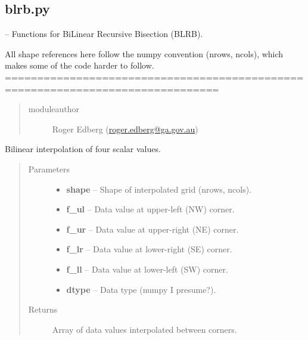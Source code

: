 \documentclass[letterpaper,10pt,english]{sphinxmanual}
\begin{document}
\subsection{blrb.py}
\label{docs/utilities:module-blrb}\label{docs/utilities:blrb-py}
{\hyperref[docs/utilities:module-blrb]{}} -- Functions for BiLinear Recursive Bisection (BLRB).

All shape references here follow the numpy convention (nrows, ncols), which
makes some of the code harder to follow.
===============================================================================
\begin{quote}\begin{description}
\item[{moduleauthor}] \leavevmode
Roger Edberg (\href{mailto:roger.edberg@ga.gov.au}{roger.edberg@ga.gov.au})

\end{description}\end{quote}


\begin{fulllineitems}
\label{docs/utilities:blrb.bilinear}
Bilinear interpolation of four scalar values.
\begin{quote}\begin{description}
\item[{Parameters}] \leavevmode\begin{itemize}
\item {} 
\textbf{shape} -- Shape of interpolated grid (nrows, ncols).

\item {} 
\textbf{f\_ul} -- Data value at upper-left (NW) corner.

\item {} 
\textbf{f\_ur} -- Data value at upper-right (NE) corner.

\item {} 
\textbf{f\_lr} -- Data value at lower-right (SE) corner.

\item {} 
\textbf{f\_ll} -- Data value at lower-left (SW) corner.

\item {} 
\textbf{dtype} -- Data type (numpy I presume?).

\end{itemize}

\item[{Returns}] \leavevmode
Array of data values interpolated between corners.

\end{description}\end{quote}

\end{fulllineitems}
\end{document}
